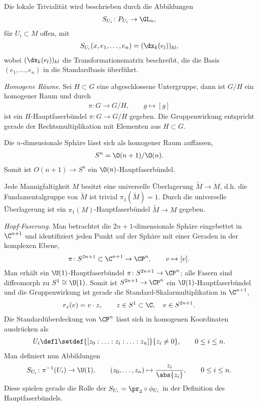 \documentclass[%
	paper=a5,%
	fleqn,%
	DIV=18,%
	BCOR=0mm,
	fontsize=11pt,
	titlepage=false,%
	bibliography=totoc,
	DIV=18,%
	twoside=true,
	pdftitle=Riemannsche Geometrie,
	pdfauthor=Uwe Semmelmann,
	numbers=noendperiod]%
	{scrbook}
\begin{document}
\begin{ex}
\begin{exenum}
Die lokale Trivialität wird beschrieben durch die Abbildungen
\begin{align*}
S_{U_i}\colon P_{U_i} \to \GL_n,
\end{align*}
für $U_i\subset M$ offen, mit
\begin{align*}
S_{U_i}(x,e_1,\ldots,e_n) = (\dx_k(e_l))_{kl},
\end{align*}
wobei $(\dx_k(e_l))_{kl}$ die Transformationsmatrix beschreibt, die die
Basis $(e_1,\ldots,e_n)$ in die Standardbasis überführt.
\item \textit{Homogene Räume}. Sei $H\subset G$ eine abgeschlossene Untergruppe,
dann ist $G/H$ ein homogener Raum und durch
\begin{align*}
\pi\colon G\to G/H,\qquad g\mapsto [g]
\end{align*}
ist ein $H$-Hauptfaserbündel $\pi\colon G\to G/H$ gegeben. Die Gruppenwirkung
entspricht gerade der Rechtsmultiplikation mit Elementen aus $H\subset G$.
\item Die $n$-dimensionale Sphäre lässt sich als homogener Raum auffassen, 
\begin{align*}
S^n =\O(n+1)/\O(n).
\end{align*}
Somit ist $O(n+1)\to S^n$ ein $\O(n)$-Hauptfaserbündel.
\item Jede Mannigfaltigkeit $M$ besitzt eine universelle Überlagerung
$\tilde{M}\to M$, d.h. die Fundamentalgruppe von $\tilde{M}$ ist trivial
$\pi_1(\tilde{M}) = 1$. Durch die universelle Überlagerung ist  ein
$\pi_1(M)$-Hauptfaserbündel $\tilde{M}\to M$ gegeben.
\item \textit{Hopf-Faserung}. 
Man betrachtet die $2n+1$-dimensionale Sphäre eingebettet in $\C^{n+1}$ und
identifiziert jeden Punkt auf der Sphäre mit einer Geraden in der komplexen
Ebene,
\begin{align*}
\pi\colon S^{2n+1}\subset\C^{n+1}\to \CP^n,\qquad v\mapsto [v].
\end{align*}
Man erhält ein $\U(1)$-Hauptfaserbündel $\pi\colon S^{2n+1}\to \CP^n$; alle Fasern sind
diffeomorph zu $S^1\cong \U(1)$. Somit ist $S^{2n+1}\to \CP^n$ ein
$\U(1)$-Hauptfaserbündel und die Gruppenwirkung ist gerade die
Standard-Skalarmultiplikation in $\C^{n+1}$,
\begin{align*}
r_z(v) = v\cdot z,\qquad z\in S^1 \subset \C,\quad v\in S^{2n+1}.
\end{align*}
Die Standardüberdeckung von $\CP^n$ lässt sich in homogenen Koordinaten
ausdrücken als
\begin{align*}
U_i \defl \setdef{[z_0:\ldots:z_i:\ldots :z_n]}{z_i\neq 0},\qquad 0\le i\le n.
\end{align*}
Man definiert nun Abbildungen
\begin{align*}
S_{U_i} \colon \pi^{-1}(U_i) \to  \U(1),\qquad
(z_0,\ldots,z_n)\mapsto \frac{z_i}{\abs{z_i}},\qquad 0\le i\le n.
\end{align*}
Diese spielen gerade die Rolle der $S_{U_i}=\pr_2\circ \phi_{U_i}$ in der Definition des
Hauptfaserbündels.\boxc
\end{exenum}
\end{ex}
\end{document}
